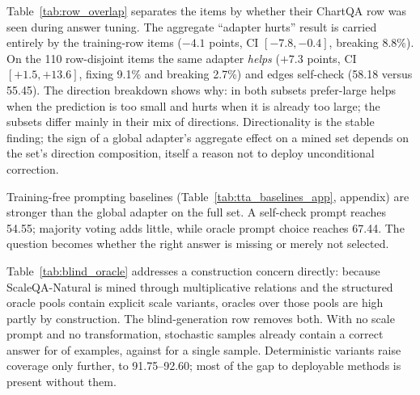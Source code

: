 \begin{table}[t]
\centering
\small
\resizebox{\textwidth}{!}{}
\caption{Row-overlap analysis on ScaleQA-Natural-473. Prefer-large is the five-seed mean; $\Delta$ is the paired per-item difference with a bootstrap 95\% CI; Fix/Break are the percentages of items the adapter corrects/breaks relative to the answer-tuned model. The direction asymmetry is the same on both subsets; the aggregate sign differs because 56\% of training-row items are prediction-too-large versus 33\% of row-disjoint items.}
\label{tab:row_overlap}
\end{table}

Table~\ref{tab:row_overlap} separates the items by whether their ChartQA row was seen during answer tuning. The aggregate ``adapter hurts'' result is carried entirely by the training-row items ($-4.1$ points, CI $[-7.8,-0.4]$, breaking 8.8\%). On the 110 row-disjoint items the same adapter \emph{helps} ($+7.3$ points, CI $[+1.5,+13.6]$, fixing 9.1\% and breaking 2.7\%) and edges self-check (58.18 versus 55.45). The direction breakdown shows why: in both subsets prefer-large helps when the prediction is too small and hurts when it is already too large; the subsets differ mainly in their mix of directions. Directionality is the stable finding; the sign of a global adapter's aggregate effect on a mined set depends on the set's direction composition, itself a reason not to deploy unconditional correction.

Training-free prompting baselines (Table~\ref{tab:tta_baselines_app}, appendix) are stronger than the global adapter on the full set. A self-check prompt reaches 54.55; majority voting adds little, while oracle prompt choice reaches 67.44. The question becomes whether the right answer is missing or merely not selected.

\begin{table}[t]
\centering
\small
\resizebox{\linewidth}{!}{}
\caption{Candidate coverage on ScaleQA-Natural-473 decomposed by candidate source. Blind sampling uses no scale prompt and no deterministic transformation, so its coverage is not implied by the mining rule.}
\label{tab:blind_oracle}
\end{table}

Table~\ref{tab:blind_oracle} addresses a construction concern directly: because ScaleQA-Natural is mined through multiplicative relations and the structured oracle pools contain explicit scale variants, oracles over those pools are high partly by construction. The blind-generation row removes both. With no scale prompt and no transformation,  stochastic samples already contain a correct answer for  of examples, against  for a single sample. Deterministic variants raise coverage only further, to 91.75--92.60; most of the gap to deployable methods is present without them.

